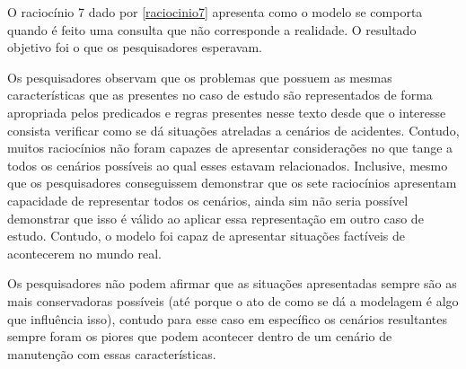 O raciocínio 7 dado por \ref{raciocinio7} apresenta como o modelo se comporta quando é feito uma consulta que não corresponde a realidade. O resultado objetivo foi o que os pesquisadores esperavam. 

Os pesquisadores observam que os problemas que possuem as mesmas características que as presentes no caso de estudo são representados de forma apropriada pelos predicados e regras presentes nesse texto desde que o interesse consista verificar como se dá situações atreladas a cenários de acidentes. Contudo, muitos raciocínios não foram capazes de apresentar considerações no que tange a todos os cenários possíveis ao qual esses estavam relacionados. Inclusive, mesmo que os pesquisadores conseguissem demonstrar que os sete raciocínios apresentam capacidade de representar todos os cenários, ainda sim não seria 
possível demonstrar que isso é válido ao aplicar essa representação em outro caso de estudo. Contudo, o modelo foi capaz de apresentar situações factíveis 
de acontecerem no mundo real. 

Os pesquisadores não podem afirmar que as situações apresentadas sempre são as mais conservadoras possíveis (até porque o ato de como se dá a modelagem é algo que influência isso), contudo para esse caso em específico os cenários resultantes sempre foram os piores que podem acontecer dentro de um cenário de manutenção com essas características. 